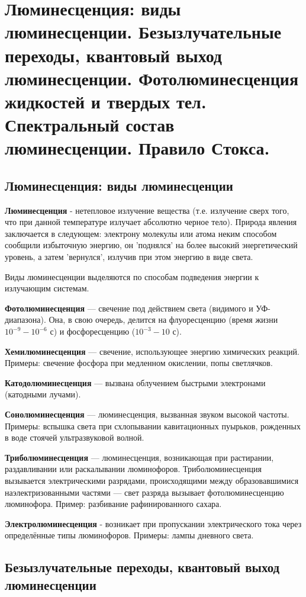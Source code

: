 \section{Люминесценция: виды люминесценции. Безызлучательные переходы, квантовый выход люминесценции. Фотолюминесценция жидкостей и твердых тел. Спектральный состав люминесценции. Правило Стокса. }

\subsection{Люминесценция: виды люминесценции}
\textbf{Люминесценция} - нетепловое излучение вещества (т.е. излучение сверх того, что при данной температуре излучает абсолютно черное тело). Природа явления заключается в следующем: электрону молекулы или атома неким способом сообщили избыточную энергию, он 'поднялся' на более высокий энергетический уровень, а затем 'вернулся', излучив при этом энергию в виде света. 


Виды люминесценции выделяются по способам подведения энергии к излучающим системам.

\textbf{Фотолюминесценция} — свечение под действием света (видимого и УФ-диапазона). Она, в свою очередь, делится на флуоресценцию (время жизни \(10^{-9}-10^{-6}\) с) и фосфоресценцию (\(10^{-3}-10\) с).


\textbf{Хемилюминесценция} — свечение, использующее энергию химических реакций. Примеры: свечение фосфора при медленном окислении, попы светлячков.


\textbf{Катодолюминесценция} — вызвана облучением быстрыми электронами (катодными лучами).


\textbf{Сонолюминесценция} — люминесценция, вызванная звуком высокой частоты. Примеры: вспышка света при схлопывании кавитационных пуырьков, рожденных в воде стоячей ультразвуковой волной.


\textbf{Триболюминесценция} — люминесценция, возникающая при растирании, раздавливании или раскалывании люминофоров. Триболюминесценция вызывается электрическими разрядами, происходящими между образовавшимися наэлектризованными частями — свет разряда вызывает фотолюминесценцию люминофора. Пример: разбивание рафинированного сахара.


\textbf{Электролюминесценция} - возникает при пропускании электрического тока через определённые типы люминофоров. Примеры: лампы дневного света.


\subsection{Безызлучательные переходы, квантовый выход люминесценции}


